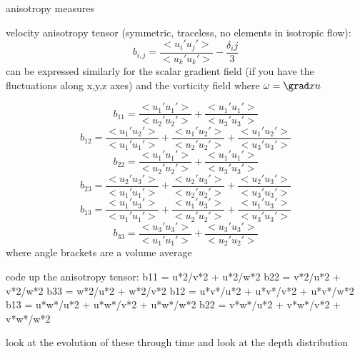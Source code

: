 \documentclass[letterpaper,10pt]{report}
\begin{document}
anisotropy measures

velocity anisotropy tensor (symmetric, traceless, no elements in isotropic flow):
\begin{equation}
	b_{i,j} = \frac{<u_i'u_j'>}{<u_k'u_k'>} - \frac{\delta_ij}{3}
\end{equation}
can be expressed similarly for the scalar gradient field (if you have the fluctuations along x,y,z axes)
and the vorticity field where $\omega = \grad x u$

\begin{equation}
b_{11} = \frac{<u_1'u_1'>}{<u_2'u_2'>} 
+ \frac{<u_1'u_1'>}{<u_3'u_3'>} 
\end{equation}
\begin{equation}
	b_{12} = \frac{<u_1'u_2'>}{<u_1'u_1'>} 
	              + \frac{<u_1'u_2'>}{<u_2'u_2'>} 
	              + \frac{<u_1'u_2'>}{<u_3'u_3'>}
\end{equation}
\begin{equation}
b_{22} =  \frac{<u_1'u_1'>}{<u_2'u_2'>} 
+ \frac{<u_1'u_1'>}{<u_3'u_3'>}
\end{equation}
\begin{equation}
b_{23} = \frac{<u_2'u_3'>}{<u_1'u_1'>} 
+ \frac{<u_2'u_3'>}{<u_2'u_2'>} 
+ \frac{<u_2'u_3'>}{<u_3'u_3'>}
\end{equation}
\begin{equation}
b_{13} = \frac{<u_1'u_3'>}{<u_1'u_1'>} 
+ \frac{<u_1'u_3'>}{<u_2'u_2'>} 
+ \frac{<u_1'u_3'>}{<u_3'u_3'>}
\end{equation}
\begin{equation}
b_{33} = \frac{<u_3'u_3'>}{<u_1'u_1'>} 
+ \frac{<u_3'u_3'>}{<u_2'u_2'>} 
\end{equation}
where angle brackets are a volume average

code up the anisotropy tensor:
b11 = u*2/v*2 + u*2/w*2
b22 = v*2/u*2 + v*2/w*2
b33 = w*2/u*2 + w*2/v*2
b12 = u*v*/u*2 + u*v*/v*2 + u*v*/w*2
b13 = u*w*/u*2 + u*w*/v*2 + u*w*/w*2
b22 = v*w*/u*2 + v*w*/v*2 + v*w*/w*2

look at the evolution of these through time
and look at the depth distribution
\end{document}
